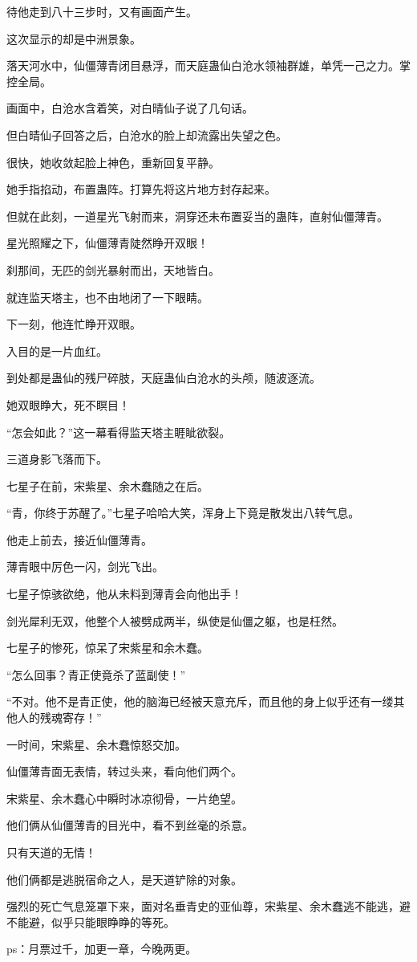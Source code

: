 \begin{this_body}
待他走到八十三步时，又有画面产生。

这次显示的却是中洲景象。

落天河水中，仙僵薄青闭目悬浮，而天庭蛊仙白沧水领袖群雄，单凭一己之力。掌控全局。

画面中，白沧水含着笑，对白晴仙子说了几句话。

但白晴仙子回答之后，白沧水的脸上却流露出失望之色。

很快，她收敛起脸上神色，重新回复平静。

她手指掐动，布置蛊阵。打算先将这片地方封存起来。

但就在此刻，一道星光飞射而来，洞穿还未布置妥当的蛊阵，直射仙僵薄青。

星光照耀之下，仙僵薄青陡然睁开双眼！

刹那间，无匹的剑光暴射而出，天地皆白。

就连监天塔主，也不由地闭了一下眼睛。

下一刻，他连忙睁开双眼。

入目的是一片血红。

到处都是蛊仙的残尸碎肢，天庭蛊仙白沧水的头颅，随波逐流。

她双眼睁大，死不瞑目！

“怎会如此？”这一幕看得监天塔主睚眦欲裂。

三道身影飞落而下。

七星子在前，宋紫星、余木蠢随之在后。

“青，你终于苏醒了。”七星子哈哈大笑，浑身上下竟是散发出八转气息。

他走上前去，接近仙僵薄青。

薄青眼中厉色一闪，剑光飞出。

七星子惊骇欲绝，他从未料到薄青会向他出手！

剑光犀利无双，他整个人被劈成两半，纵使是仙僵之躯，也是枉然。

七星子的惨死，惊呆了宋紫星和余木蠢。

“怎么回事？青正使竟杀了蓝副使！”

“不对。他不是青正使，他的脑海已经被天意充斥，而且他的身上似乎还有一缕其他人的残魂寄存！”

一时间，宋紫星、余木蠢惊怒交加。

仙僵薄青面无表情，转过头来，看向他们两个。

宋紫星、余木蠢心中瞬时冰凉彻骨，一片绝望。

他们俩从仙僵薄青的目光中，看不到丝毫的杀意。

只有天道的无情！

他们俩都是逃脱宿命之人，是天道铲除的对象。

强烈的死亡气息笼罩下来，面对名垂青史的亚仙尊，宋紫星、余木蠢逃不能逃，避不能避，似乎只能眼睁睁的等死。

ps：月票过千，加更一章，今晚两更。

\end{this_body}

